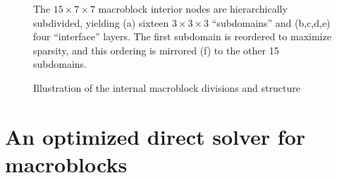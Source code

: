 \begin{figure}
\centering
{}


\caption{Illustration of the internal macroblock divisions and
  structure}{The $15\!\times\!7\!\times\!7$ macroblock interior nodes
  are hierarchically subdivided, yielding (a) sixteen
  $3\!\times\!3\!\times\!3$ ``subdomains'' and (b,c,d,e) four
  ``interface'' layers. The first subdomain is reordered to maximize
  sparsity, and this ordering is mirrored (f) to the other 15
  subdomains.}
\label{fig:macroblocks:structure}
\vspace*{-.15in}

\end{figure}

\section{An optimized direct solver for macroblocks}
\label{sec:macroblocks:local-solver}

